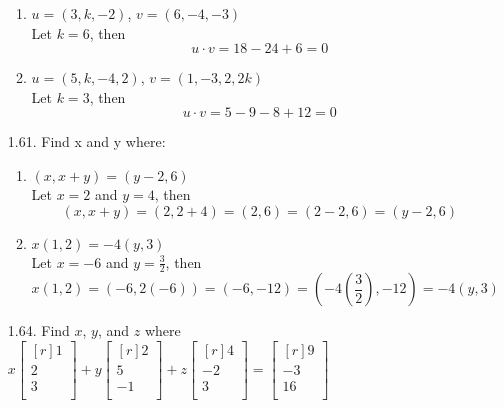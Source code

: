 \documentclass[12pt]{article}
\begin{document}
\begin{enumerate}
\begin{enumerate}
	\item $u=(3,k,-2)$, $v=(6,-4,-3)$\\
		Let $k=6$, then
		\[ u \cdot v = 18 - 24 + 6 = 0 \]
	\item $u=(5,k,-4,2)$, $v=(1,-3,2,2k)$\\
		Let $k=3$, then
		\[ u \cdot v = 5 - 9 - 8 + 12 =  0 \]
	\end{enumerate}
\item[1.61.] Find x and y where:
	\begin{enumerate}
	\item $(x,x+y)=(y-2,6)$\\
		Let $x=2$ and $y=4$, then
		\[ (x,x+y) = (2, 2+4) = (2,6) = (2-2,6) = (y-2,6) \]
	\item $x(1,2)=-4(y,3)$\\
		Let $x=-6$ and $y=\frac{3}{2}$, then
		\[ x(1,2) = (-6,2(-6)) = (-6,-12) = (-4(\frac{3}{2}),-12) = -4(y,3) \]
	\end{enumerate}
	
\item[1.64.] Find $x$, $y$, and $z$ where
	$x \begin{bmatrix}[r] 1\\ 2\\ 3\\ \end{bmatrix}
	+ y \begin{bmatrix}[r] 2\\ 5\\ -1\\ \end{bmatrix}
	+ z \begin{bmatrix}[r] 4\\ -2\\ 3\\ \end{bmatrix}
	= \begin{bmatrix}[r] 9\\ -3\\ 16\\ \end{bmatrix}$\\
		

\end{enumerate}
\end{document}
